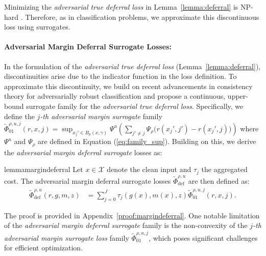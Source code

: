 Minimizing the \textit{adversarial true deferral loss} in Lemma~\ref{lemma:deferral} is NP-hard \citep{Statistical, bartlett1, Steinwart2007HowTC, Awasthi_Mao_Mohri_Zhong_2022_multi}. Therefore, as in classification problems, we approximate this discontinuous loss using surrogates.


\paragraph{Adversarial Margin Deferral Surrogate Losses:}  
In the formulation of the \textit{adversarial true deferral loss} (Lemma~\ref{lemma:deferral}), discontinuities arise due to the indicator function in the loss definition. To approximate this discontinuity, we build on recent advancements in consistency theory for adversarially robust classification \citep{bao2021calibratedsurrogatelossesadversarially, Awasthi_Mao_Mohri_Zhong_2022_multi, Grounded, mao2023crossentropylossfunctionstheoretical} and propose a continuous, upper-bound surrogate family for the \textit{adversarial true deferral loss}. Specifically, we define the \textit{\(j\)-th adversarial margin surrogate} family $\widetilde{\Phi}^{\rho,u,j}_{01}(r, x, j) = \sup_{x_j' \in B_p(x, \gamma)} \Psi^u \left( \sum_{j' \neq j} \Psi_\rho \big( r(x_j', j') - r(x_j', j) \big) \right)$
where \(\Psi^u\) and \(\Psi_\rho\) are defined in Equation (\ref{eq:family_sup}). Building on this, we derive the \textit{adversarial margin deferral surrogate} losses as:

\begin{restatable}{lemma}{margindeferral} \label{lemma:deferralmargin}
    Let \( x \in \mathcal{X} \) denote the clean input  and \( \tau_j \) the aggregated cost. The adversarial margin deferral surrogate losses \( \widetilde{\Phi}^{\rho, u}_{\text{def}} \) are then defined as:
    \begin{equation*}
    \begin{aligned}
        \widetilde{\Phi}^{\rho, u}_{\text{def}}(r, g, m, z) & = \sum_{j=0}^J \tau_j(g(x), m(x), z) \widetilde{\Phi}^{\rho,u,j}_{01}(r, x, j).
    \end{aligned}
    \end{equation*}
\end{restatable}
The proof is provided in Appendix~\ref{proof:margindeferral}. One notable limitation of the \textit{adversarial margin deferral surrogate}  family is the non-convexity of the \textit{\(j\)-th adversarial margin surrogate loss} family \( \widetilde{\Phi}^{\rho,u,j}_{01} \), which poses significant challenges for efficient optimization.

